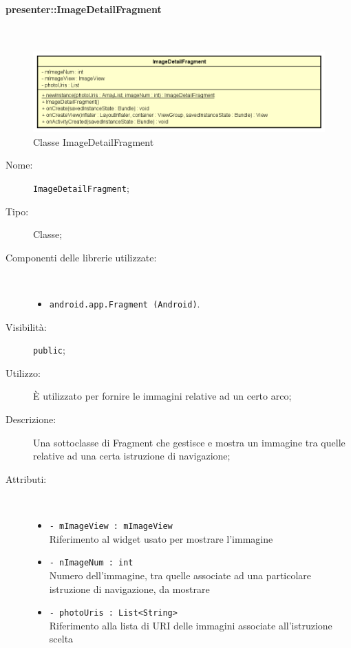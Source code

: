 \documentclass[../DefinizioneDiProdotto.tex]{subfiles}
\begin{document}
\paragraph{presenter::ImageDetailFragment}
\
\begin{figure}[H]
	\centering
	\includegraphics[width=\maxwidth]{img/ImageDetailFragment.png}
	\caption{Classe ImageDetailFragment}\label{fig:presenter::ImageDetailFragment} 
\end{figure}
\begin{description}
	\item[Nome:] \texttt{ImageDetailFragment};
	\item[Tipo:] Classe;
	\item[Componenti delle librerie utilizzate:] \
\begin{itemize}
\item \texttt{android.app.Fragment (Android)}.
\end{itemize}
	\item[Visibilità:] \texttt{public};
	\item[Utilizzo:] È utilizzato per fornire le immagini relative ad un certo arco;
	\item[Descrizione:] Una sottoclasse di Fragment che gestisce e mostra un immagine tra quelle relative ad una certa istruzione di navigazione;
	\item[Attributi:] \
	\begin{itemize}
		\item \texttt{- mImageView : mImageView}\\
		Riferimento al widget usato per mostrare l'immagine
		
		\item \texttt{- nImageNum : int}\\
		Numero dell'immagine, tra quelle associate ad una particolare istruzione di navigazione,  da mostrare
		
		\item \texttt{- photoUris : List<String>}\\
		Riferimento alla lista di URI delle immagini associate all'istruzione scelta
		

\end{itemize}
\end{description}
\end{document}

